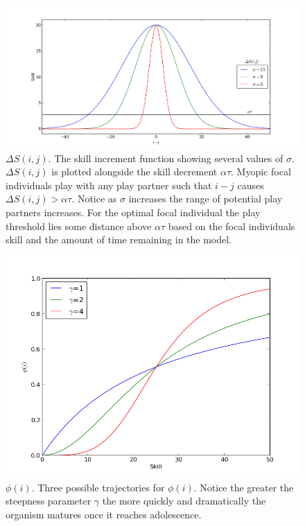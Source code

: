 \begin{figure}[h]
\caption{$\Delta S(i,j)$. The skill increment function showing several values of $\sigma$. $\Delta S(i,j)$ is plotted alongside the skill decrement $\alpha \tau$. Myopic focal individuals play with any play partner such that $i-j$ causes $\Delta S(i,j)>\alpha \tau$. Notice as $\sigma$ increases the range of potential play partners increases. For the optimal focal individual the play threshold lies some distance above $\alpha \tau$ based on the focal individuals skill and the amount of time remaining in the model.      }
\begin{center}
\includegraphics[width=160mm]{sdf.png}
\end{center}
\label{sdf}
\end{figure}



\begin{figure}[h]
\caption{$\phi(i)$. Three possible trajectories for $\phi(i)$. Notice the greater the steepness parameter $\gamma$ the more quickly and dramatically the organism matures once it reaches adolescence. }
\begin{center}
\includegraphics[width=160mm]{phi.png}
\end{center}
\label{phi}
\end{figure}



